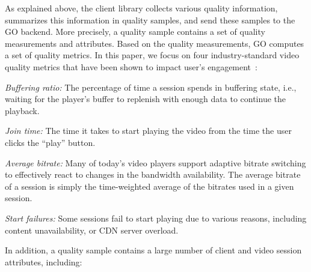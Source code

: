 As explained above, the client library collects various quality
information, summarizes this information in quality samples, and send
these samples to the GO backend. More precisely, a quality sample
contains a set of quality measurements and attributes. Based on the
quality measurements, GO computes a set of quality metrics. In this
paper, we focus on four industry-standard video quality metrics that
have been shown to impact user's engagement~\cite{sigcomm11}:
\begin{packedenumerate}
\item \emph{Buffering ratio:} The percentage of time a session spends
  in buffering state, i.e., waiting for the player's buffer to
  replenish with enough data to continue the playback.
\item \emph{Join time:} The time it takes to start playing the video
  from the time the user clicks the ``play'' button.
\item \emph{Average bitrate:} Many of today's video players support
  adaptive bitrate switching to effectively react to changes in the
  bandwidth availability. The average bitrate of a session is simply
  the time-weighted average of the bitrates used in a given session.
\item \emph{Start failures:} Some sessions fail to start playing due
  to various reasons, including content unavailability, or CDN server
  overload.
\end{packedenumerate}


In addition, a quality sample contains a large number of client and
video session attributes, including:

